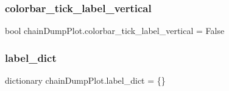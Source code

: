 \subsubsection{\texorpdfstring{colorbar\+\_\+tick\+\_\+label\+\_\+vertical}{colorbar\_tick\_label\_vertical}}
{\footnotesize\ttfamily bool chain\+Dump\+Plot.\+colorbar\+\_\+tick\+\_\+label\+\_\+vertical = False}

\mbox{\label{namespacechainDumpPlot_aa13865e3d9d72f53f82ad8b5340b2051}} 
\subsubsection{\texorpdfstring{label\+\_\+dict}{label\_dict}}
{\footnotesize\ttfamily dictionary chain\+Dump\+Plot.\+label\+\_\+dict = \{\}}


